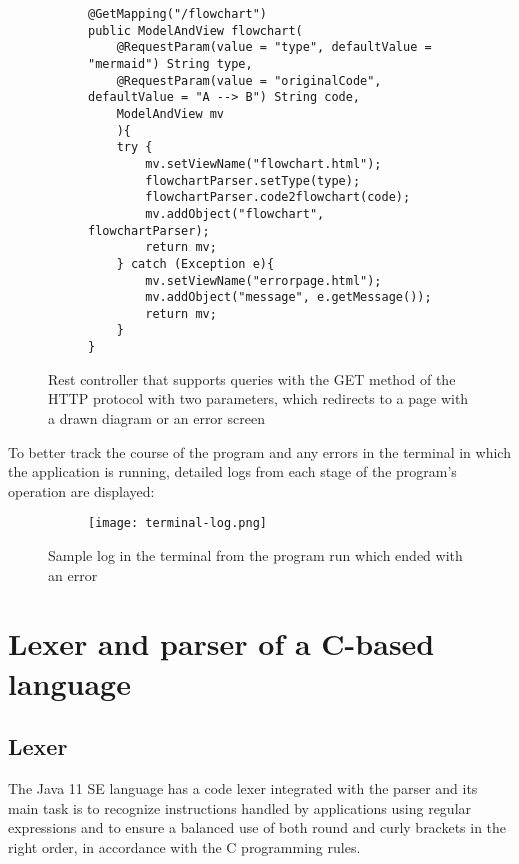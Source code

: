 \begin{figure}[H]
	\begin{subfigure}{\textwidth}
			\begin{verbatim}
@GetMapping("/flowchart")
public ModelAndView flowchart(
    @RequestParam(value = "type", defaultValue = "mermaid") String type,
    @RequestParam(value = "originalCode", defaultValue = "A --> B") String code,
    ModelAndView mv
    ){
    try {
        mv.setViewName("flowchart.html");
        flowchartParser.setType(type);
        flowchartParser.code2flowchart(code);
        mv.addObject("flowchart", flowchartParser);
        return mv;
    } catch (Exception e){
        mv.setViewName("errorpage.html");
        mv.addObject("message", e.getMessage());
        return mv;
    }
}
			\end{verbatim}
	\end{subfigure}\hfill
  	\caption{Rest controller that supports queries with the GET method of the HTTP protocol with two parameters, which redirects to a page with a drawn diagram or an error screen}
\end{figure}

\bigbreak
To better track the course of the program and any errors in the terminal in which the application is running, detailed logs from each stage of the program's operation are displayed:
		
\begin{figure}[H]
  \begin{subfigure}{\textwidth}
  \centering
    \texttt{[image: terminal-log.png]}
  \end{subfigure}\hfill
  \caption{Sample log in the terminal from the program run which ended with an error}
\end{figure}
	

\section{Lexer and parser of a C-based language}
	\subsection{Lexer} 
  The Java 11 SE language has a code lexer integrated with the parser and its main task is to recognize instructions handled by applications using regular expressions and to ensure a balanced use of both round and curly brackets in the right order, in accordance with the C programming rules. 

